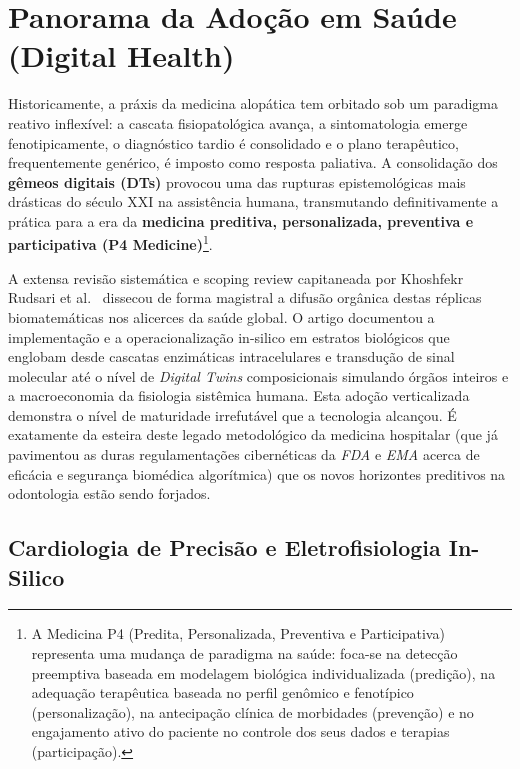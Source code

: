 \section{Panorama da Adoção em Saúde (Digital Health)}

Historicamente, a práxis da medicina alopática tem orbitado sob um paradigma reativo inflexível: a cascata fisiopatológica avança, a sintomatologia emerge fenotipicamente, o diagnóstico tardio é consolidado e o plano terapêutico, frequentemente genérico, é imposto como resposta paliativa. A consolidação dos \textbf{gêmeos digitais (DTs)} provocou uma das rupturas epistemológicas mais drásticas do século XXI na assistência humana, transmutando definitivamente a prática para a era da \textbf{medicina preditiva, personalizada, preventiva e participativa (P4 Medicine)}\footnote{A Medicina P4 (Predita, Personalizada, Preventiva e Participativa) representa uma mudança de paradigma na saúde: foca-se na detecção preemptiva baseada em modelagem biológica individualizada (predição), na adequação terapêutica baseada no perfil genômico e fenotípico (personalização), na antecipação clínica de morbidades (prevenção) e no engajamento ativo do paciente no controle dos seus dados e terapias (participação).}.

A extensa revisão sistemática e scoping review capitaneada por Khoshfekr Rudsari et al.~\cite{khoshfekr2025digital} dissecou de forma magistral a difusão orgânica destas réplicas biomatemáticas nos alicerces da saúde global. O artigo documentou a implementação e a operacionalização in-silico em estratos biológicos que englobam desde cascatas enzimáticas intracelulares e transdução de sinal molecular até o nível de \textit{Digital Twins} composicionais simulando órgãos inteiros e a macroeconomia da fisiologia sistêmica humana. Esta adoção verticalizada demonstra o nível de maturidade irrefutável que a tecnologia alcançou. É exatamente da esteira deste legado metodológico da medicina hospitalar (que já pavimentou as duras regulamentações cibernéticas da \textit{FDA} e \textit{EMA} acerca de eficácia e segurança biomédica algorítmica) que os novos horizontes preditivos na odontologia estão sendo forjados.

\subsection{Cardiologia de Precisão e Eletrofisiologia In-Silico}


